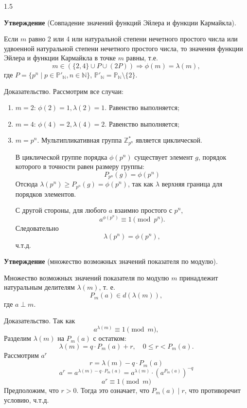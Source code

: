 \documentclass[14pt,a4paper]{extarticle}
\begin{document}
\begin{spacing}{1.5}

\noindent \textbf{Утверждение} (Совпадение значений функций Эйлера и функции Кармайкла).

\noindent Если \(m\) равно 2 или 4 или натуральной степени нечетного простого числа или удвоенной натуральной степени нечетного простого числа, то значения функции Эйлера и функции Кармайкла в точке \(m\) равны, т.е.
\[
    m \in (\{2, 4\} \cup P \cup (2P)) \Rightarrow \phi(m) = \lambda(m),
\]
где \(P = \{p^n \mid p \in \mathbb{P}'_{\mathbb{N}}, n \in \mathbb{N}\}\), \(\mathbb{P}'_{\mathbb{N}} = \mathbb{P}_{\mathbb{N}} \setminus \{2\}\).

\noindent Доказательство.
Рассмотрим все случаи:
\begin{enumerate}
    \item \(m = 2\): \(\phi(2) = 1, \lambda(2) = 1\). Равенство выполняется;
    \item \(m = 4\): \(\phi(4) = 2, \lambda(4) = 2\). Равенство выполняется;
    \item \(m = p^n\). Мультипликативная группа \(\mathbb{Z}_{p^n}^*\) является циклической.
    
    В циклической группе порядка \(\phi(p^n)\) существует элемент \(g\), порядок которого в точности равен размеру группы:
    \[
        P_{p^n}(g) = \phi(p^n)
    \]
    Отсюда \(\lambda(p^n) \ge P_{p^n}(g) = \phi(p^n)\), так как \(\lambda\) верхняя граница для порядков элементов.
    
    С другой стороны, для любого \(a\) взаимно простого с \(p^n\),
    \[
        a^{\phi(p^n)} \equiv 1 \pmod{p^n}.
    \]
    Следовательно
    \[
        \lambda(p^n) = \phi(p^n),
    \]
    ч.т.д.
\end{enumerate}

\vspace{1cm}

\noindent \textbf{Утверждение} (множество возможных значений показателя по модулю).

\noindent Множество возможных значений показателя по модулю \(m\) принадлежит натуральным делителям \(\lambda(m)\), т. е.
\[
    P_m(a) \in d(\lambda(m)),
\]
где \(a \perp m\).

\noindent Доказательство.
Так как
\[
    a^{\lambda(m)} \equiv 1 \pmod m,
\]
Разделим \(\lambda(m)\) на \(P_m(a)\) с остатком:
\[
    \lambda(m) = q \cdot P_m(a) + r, \quad 0 \le r < P_m(a).
\]
Рассмотрим \(a^r\)
\[
    r = \lambda(m) - q \cdot P_m(a)
\]
\[
    a^r = a^{\lambda(m) - q \cdot P_m(a)} = a^{\lambda(m)} \cdot (a^{P_m(a)})^{-q}
\]
\[
    a^r \equiv 1 \pmod m
\]
Предположим, что \(r > 0\). Тогда это означает, что \(P_m(a) \mid r\), что противоречит условию, ч.т.д.


\end{spacing}
\end{document}
